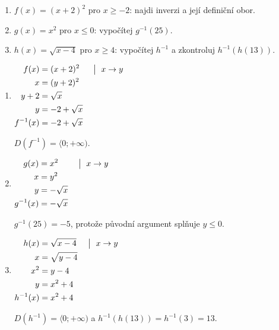 \documentclass[11pt,a4paper]{article}
\begin{document}

\begin{zadaniReseniBox}[title={Samostatná práce 1}]
\begin{enumerate}[label=\alph*)]
\item $f(x)=(x+2)^2$ pro $x\ge-2$: najdi inverzi a její definiční obor.
\item $g(x)=x^2$ pro $x\le0$: vypočítej $g^{-1}(25)$.
\item $h(x)=\sqrt{x-4}$ pro $x\ge4$: vypočítej $h^{-1}$ a zkontroluj $h^{-1}(h(13))$.
\end{enumerate}
\tcblower
\begin{enumerate}[label=\alph*)]
\item
\(\displaystyle\begin{aligned}f(x)&=(x+2)^2 &&\bigm|\ x\to y\\x&=(y+2)^2\\y+2&=\sqrt{x}\\y&=-2+\sqrt{x}\\f^{-1}(x)&=-2+\sqrt{x}\end{aligned}\)

$D(f^{-1})=\langle0;+\infty)$.
\item
\(\displaystyle\begin{aligned}g(x)&=x^2 &&\bigm|\ x\to y\\x&=y^2\\y&=-\sqrt{x}\\g^{-1}(x)&=-\sqrt{x}\end{aligned}\)

$g^{-1}(25)=-5$, protože původní argument splňuje $y\le0$.
\item
\(\displaystyle\begin{aligned}h(x)&=\sqrt{x-4} &&\bigm|\ x\to y\\x&=\sqrt{y-4}\\x^2&=y-4\\y&=x^2+4\\h^{-1}(x)&=x^2+4\end{aligned}\)

$D(h^{-1})=\langle0;+\infty)$ a $h^{-1}(h(13))=h^{-1}(3)=13$.
\end{enumerate}
\end{zadaniReseniBox}
\end{document}
